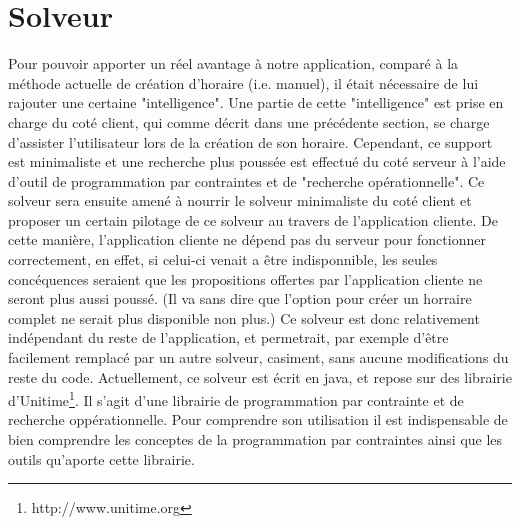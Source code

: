 \chapter{Solveur}




Pour pouvoir apporter un réel avantage à notre application, comparé à la méthode actuelle de création d'horaire (i.e. manuel), il était nécessaire de lui rajouter une certaine "intelligence". 
Une partie de cette "intelligence" est prise en charge du coté client, qui comme décrit dans une précédente section, se charge d'assister l'utilisateur lors de la création de son horaire.
\newline
\indent
Cependant, ce support est minimaliste et une recherche plus poussée est effectué du coté serveur à l'aide d'outil de programmation par contraintes et de "recherche opérationnelle".  Ce solveur sera ensuite amené à nourrir le solveur minimaliste du coté client et proposer un certain pilotage de ce solveur au travers de l'application cliente. 
De cette manière, l'application cliente ne dépend pas du serveur pour fonctionner correctement, en effet, si celui-ci venait a être indisponnible, les seules concéquences seraient que les propositions offertes par l'application cliente ne seront plus aussi poussé. (Il va sans dire que l'option pour créer un horraire complet ne serait plus disponible non plus.)
\newline
\indent
Ce solveur est donc relativement indépendant du reste de l'application, et permetrait, par exemple d'être facilement remplacé par un autre solveur, casiment, sans aucune modifications du reste du code.
Actuellement, ce solveur est écrit en java, et repose sur des librairie d'Unitime\footnote{http://www.unitime.org}. Il s'agit d'une librairie de programmation par contrainte et de recherche oppérationnelle.  Pour comprendre son utilisation il est indispensable de bien comprendre les conceptes de la programmation par contraintes ainsi que les outils qu'aporte cette librairie.

